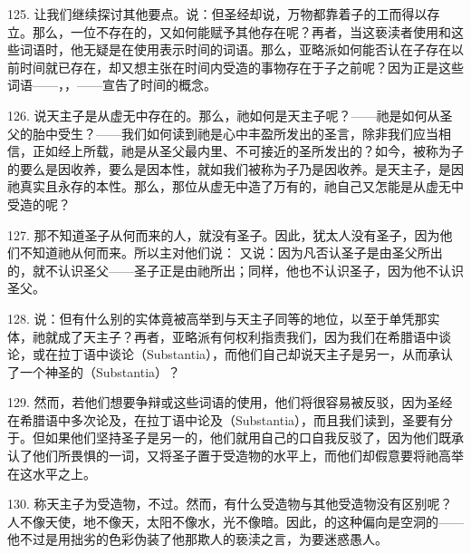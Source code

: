 125. 让我们继续探讨其他要点。说：但圣经却说，万物都靠着子的工而得以存立。那么，一位不存在的，又如何能赋予其他存在呢？再者，当这亵渎者使用和这些词语时，他无疑是在使用表示时间的词语。那么，亚略派如何能否认在子存在以前时间就已存在，却又想主张在时间内受造的事物存在于子之前呢？因为正是这些词语——，，——宣告了时间的概念。\par

126. 说天主子是从虚无中存在的。那么，祂如何是天主子呢？——祂是如何从圣父的胎中受生？——我们如何读到祂是心中丰盈所发出的圣言，除非我们应当相信，正如经上所载，祂是从圣父最内里、不可接近的圣所发出的？如今，被称为子的要么是因收养，要么是因本性，就如我们被称为子乃是因收养。是天主子，是因祂真实且永存的本性。那么，那位从虚无中造了万有的，祂自己又怎能是从虚无中受造的呢？\par

127. 那不知道圣子从何而来的人，就没有圣子。因此，犹太人没有圣子，因为他们不知道祂从何而来。所以主对他们说： 又说：因为凡否认圣子是由圣父所出的，就不认识圣父——圣子正是由祂所出；同样，他也不认识圣子，因为他不认识圣父。\par

128. 说：但有什么别的实体竟被高举到与天主子同等的地位，以至于单凭那实体，祂就成了天主子？再者，亚略派有何权利指责我们，因为我们在希腊语中谈论，或在拉丁语中谈论（Substantia），而他们自己却说天主子是另一，从而承认了一个神圣的（Substantia）？\par

129. 然而，若他们想要争辩或这些词语的使用，他们将很容易被反驳，因为圣经在希腊语中多次论及，在拉丁语中论及（Substantia），而且我们读到，圣要有分于。但如果他们坚持圣子是另一的，他们就用自己的口自我反驳了，因为他们既承认了他们所畏惧的一词，又将圣子置于受造物的水平上，而他们却假意要将祂高举在这水平之上。\par

130. 称天主子为受造物，不过。然而，有什么受造物与其他受造物没有区别呢？人不像天使，地不像天，太阳不像水，光不像暗。因此，的这种偏向是空洞的——他不过是用拙劣的色彩伪装了他那欺人的亵渎之言，为要迷惑愚人。\par

